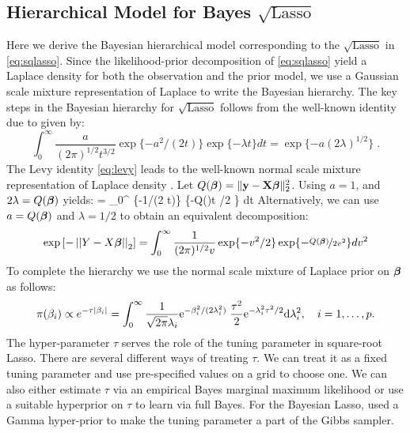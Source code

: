 \documentclass[10pt]{article}
\def\sql{$\sqrt{\text{Lasso}}$}
\begin{document}
\subsection{Hierarchical Model for Bayes \sql{}}
Here we derive the Bayesian hierarchical model corresponding to the $\sqrt{\text{Lasso}}$ in \eqref{eq:sqlasso}. Since the likelihood-prior decomposition of \eqref{eq:sqlasso} yield a Laplace density for both the observation and the prior model, we use a Gaussian scale mixture representation of Laplace to write the Bayesian hierarchy. The key steps in the Bayesian hierarchy for $\sqrt{\text{Lasso}}$ follows from the well-known identity due to \citet{levy1940certains} given by:
\begin{equation}
  \int_{0}^{\infty} \frac{a}{(2 \pi)^{1/2} t^{3/2}} \exp\{-{a^2}/({2 t})\} \exp\{-\lambda t\} dt = \exp\{-a (2 \lambda)^{1/2} \} \;.\label{eq:levy}
\end{equation}
The Levy identity \eqref{eq:levy} leads to the  well-known normal scale mixture representation of Laplace density \citep{andrews_scale_1974}. Let $Q(\boldsymbol{\beta})= \lVert{\bf y} - {\bf X} \boldsymbol{\beta}\rVert_2^2$. Using $a = 1$, and $2\lambda = Q(\boldsymbol{\beta})$ yields:
\beq
\exp {} = \int_{0}^{\infty}  \exp\{-{1}/({2 t})\} \exp\{-Q(\bbeta)t /2 \} dt \label{eq:t_i}
\eeq
Alternatively, we can use $a = Q(\boldsymbol{\beta})$ and $\lambda = 1/2$ to obtain an equivalent decomposition:
\begin{equation}
\exp \left[-\left|\left|Y - X\boldsymbol{\beta}\right|\right|_2 \right] = \int_{0}^{\infty} \frac{1}{(2 \pi)^{1/2} v} \exp\{-{v^2}/{2}\} \exp\{- \nicefrac{Q(\boldsymbol{\beta})}{2v^2}\} dv^2 \label{eq:v_i}
\end{equation}
To complete the hierarchy we use the normal scale mixture of Laplace prior on $\boldsymbol{\beta}$  as follows:
\[
\pi(\beta_i) \propto e^{-\tau \lvert\beta_i\rvert} = \int_{0}^{\infty} \frac{1}{\sqrt{2\pi} \lambda_i} {\rm e}^{-\beta_i^2/(2\lambda_i^2)} \; \frac{\tau^2}{2} {\rm e}^{-\lambda_i^2\tau^2/2} {\rm d} \lambda_i^2, \quad i = 1, \ldots, p.
\]
The hyper-parameter $\tau$ serves the role of the tuning parameter in square-root Lasso. There are several different ways of treating $\tau$. We can treat it as a fixed tuning parameter and use pre-specified values on a grid to choose one.  We can also either estimate $\tau$ via an empirical Bayes marginal maximum likelihood or use a suitable hyperprior on $\tau$ to learn via full Bayes. For the Bayesian Lasso, \cite{park_bayesian_2008} used a Gamma hyper-prior to make the tuning parameter a part of the Gibbs sampler. 
\end{document}
